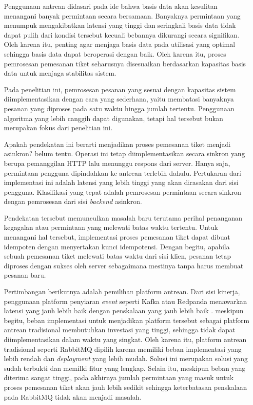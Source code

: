 Penggunaan antrean didasari pada ide bahwa basis data akan kesulitan menangani banyak permintaan secara bersamaan. Banyaknya permintaan yang menumpuk mengakibatkan latensi yang tinggi dan seringkali basis data tidak dapat pulih dari kondisi tersebut kecuali bebannya dikurangi secara signifikan. Oleh karena itu, penting agar menjaga basis data pada utilisasi yang optimal sehingga basis data dapat beroperasi dengan baik. Oleh karena itu, proses pemrosesan pemesanan tiket seharusnya disesuaikan berdasarkan kapasitas basis data untuk menjaga stabilitas sistem.

Pada penelitian ini, pemrosesan pesanan yang sesuai dengan kapasitas sistem diimplementasikan dengan cara yang sederhana, yaitu membatasi banyaknya pesanan yang diproses pada satu waktu hingga jumlah tertentu. Penggunaan algoritma yang lebih canggih dapat digunakan, tetapi hal tersebut bukan merupakan fokus dari penelitian ini.

Apakah pendekatan ini berarti menjadikan proses pemesanan tiket menjadi asinkron? belum tentu. Operasi ini tetap diimplementasikan secara sinkron yang berupa pemanggilan HTTP lalu menunggu respons dari server. Hanya saja, permintaan pengguna dipindahkan ke antrean terlebih dahulu. Pertukaran dari implementasi ini adalah latensi yang lebih tinggi yang akan dirasakan dari sisi pengguna. Klasifikasi yang tepat adalah pemrosesan permintaan secara sinkron dengan pemrosesan dari sisi \textit{backend} asinkron.

Pendekatan tersebut memunculkan masalah baru terutama perihal penanganan kegagalan atau permintaan yang melewati batas waktu tertentu. Untuk menangani hal tersebut, implementasi proses pemesanan tiket dapat dibuat idempoten dengan menyertakan kunci idempotensi. Dengan begitu, apabila sebuah pemesanan tiket melewati batas waktu dari sisi klien, pesanan tetap diproses dengan sukses oleh server sebagaimana mestinya tanpa harus membuat pesanan baru.

Pertimbangan berikutnya adalah pemilihan platform antrean. Dari sisi kinerja, penggunaan platform penyiaran \textit{event} seperti Kafka atau Redpanda menawarkan latensi yang jauh lebih baik dengan penskalaan yang jauh lebih baik \parencite{comparingKafkaAlternatives}. meskipun begitu, beban implementasi untuk menjadikan platform tersebut sebagai platform antrean tradisional membutuhkan investasi yang tinggi, sehingga tidak dapat diimplementasikan dalam waktu yang singkat. Oleh karena itu, platform antrean tradisional seperti RabbitMQ dipilih karena memiliki beban implementasi yang lebih rendah dan \textit{deployment} yang lebih mudah. Solusi ini merupakan solusi yang sudah terbukti dan memilki fitur yang lengkap. Selain itu, meskipun beban yang diterima sangat tinggi, pada akhirnya jumlah permintaan yang masuk untuk proses pemesanan tiket akan jauh lebih sedikit sehingga keterbatasan penskalaan pada RabbitMQ tidak akan menjadi masalah.
